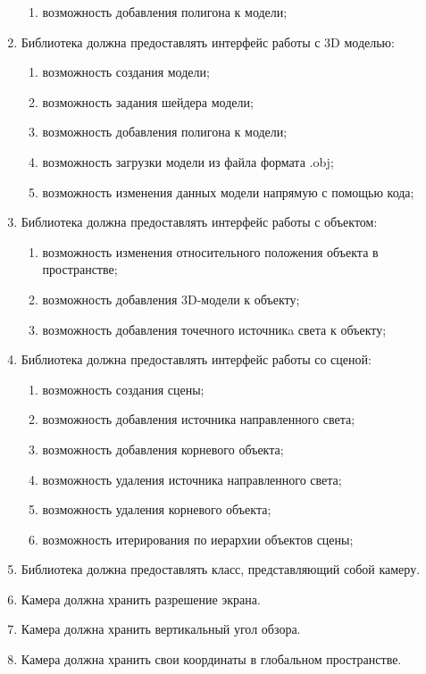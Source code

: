\begin{enumerate}
\begin{enumerate}
        \item возможность добавления полигона к модели;
    \end{enumerate}
    \item Библиотека должна предоставлять интерфейс работы с 3D моделью:
    \begin{enumerate}
        \item возможность создания модели;
        \item возможность задания шейдера модели;
        \item возможность добавления полигона к модели;
        \item возможность загрузки модели из файла формата .obj;
        \item возможность изменения данных модели напрямую с помощью кода;
    \end{enumerate}	
     \item Библиотека должна предоставлять интерфейс работы с объектом:
    \begin{enumerate}
        \item возможность изменения относительного положения объекта в пространстве;
        \item возможность добавления 3D-модели к объекту;
        \item возможность добавления точечного источникa света к объекту;
    \end{enumerate}
    \item Библиотека должна предоставлять интерфейс работы со сценой:
    \begin{enumerate}
        \item возможность создания сцены;
        \item возможность добавления источника направленного света;
        \item возможность добавления корневого объекта;
        \item возможность удаления источника направленного света;
        \item возможность удаления корневого объекта;
        \item возможность итерирования по иерархии объектов сцены;
    \end{enumerate}
    \item Библиотека должна предоставлять класс, представляющий собой камеру.
    \item Камера должна хранить разрешение экрана.
    \item Камера должна хранить вертикальный угол обзора.
    \item Камера должна хранить свои координаты в глобальном пространстве.

\end{enumerate}
